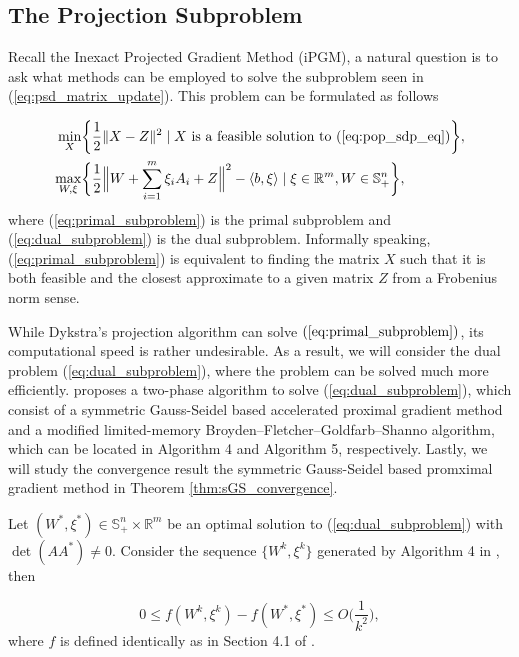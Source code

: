 \documentclass[12pt]{l4dc2021}
\begin{document}
    \subsection{The Projection Subproblem}
    Recall the Inexact Projected Gradient Method (iPGM), a natural question is to ask what methods can be employed to solve the subproblem seen in (\ref{eq:psd_matrix_update}). This problem can be formulated as follows

    \begin{align}
        \min_X & \bigg\{\frac{1}{2} \|X-Z\|^2 \mid X \text{ is a feasible solution to } (\ref{eq:pop_sdp_eq}) \bigg\}, \label{eq:primal_subproblem}\\
        \max_{W,\xi} & \bigg\{ \frac{1}{2} \Big\|W + \sum_{i=1}^m\xi_iA_i + Z \Big\|^2 - \langle b, \xi \rangle \mid \xi \in \mathbb{R}^m, W \in \mathbb{S}_+^n \bigg\}, \label{eq:dual_subproblem}
    \end{align}
    where (\ref{eq:primal_subproblem}) is the primal subproblem and (\ref{eq:dual_subproblem}) is the dual subproblem. Informally speaking, (\ref{eq:primal_subproblem}) is equivalent to finding the matrix $X$ such that it is both feasible and the closest approximate to a given matrix $Z$ from a Frobenius norm sense. 

    While Dykstra's projection algorithm can solve $(\ref{eq:primal_subproblem})$, its computational speed is rather undesirable. As a result, we will consider the dual problem (\ref{eq:dual_subproblem}), where the problem can be solved much more efficiently. \cite{yang2021inexact} proposes a two-phase algorithm to solve (\ref{eq:dual_subproblem}), which consist of a symmetric Gauss-Seidel based accelerated proximal gradient method and a modified limited-memory Broyden–Fletcher–Goldfarb–Shanno algorithm, which can be located in Algorithm 4 and Algorithm 5, respectively. Lastly, we will study the convergence result the symmetric Gauss-Seidel based promximal gradient method in Theorem \ref{thm:sGS_convergence}. 

    \begin{theorem} \label{thm:sGS_convergence}
        Let $(W^*, \xi^*) \in \mathbb{S}_+^n \times \mathbb{R}^m$ be an optimal solution to (\ref{eq:dual_subproblem}) with $\det(AA^*) \ne 0$. Consider the sequence $\{W^k, \xi^k\}$ generated by Algorithm 4 in \cite{yang2021inexact}, then 

        \begin{equation}
            0 \le f(W^k, \xi^k) - f(W^*, \xi^*) \le O\bigg(\frac{1}{k^2}\bigg),
        \end{equation}
        where $f$ is defined identically as in Section 4.1 of \cite{yang2021inexact}.
    \end{theorem}
\end{document}
